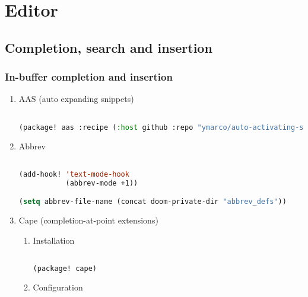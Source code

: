 \documentclass[11pt]{article}
\begin{document}
\section{Editor}
\label{sec:editor}


\subsection{Completion, search and insertion}
\label{sec:completion-search-and-insertion}


\subsubsection{In-buffer completion and insertion}
\label{sec:in-buffer-completion-and-insertion}


\begin{enumerate}
  \item AAS (auto expanding snippets)
  \label{sec:aas-auto-expanding-snippets}

  \begin{lstlisting}[language=Lisp]%! Someone please complete this list for me

(package! aas :recipe (:host github :repo "ymarco/auto-activating-snippets"))
\end{lstlisting}
  \item Abbrev
  \label{sec:abbrev}

  \begin{lstlisting}[language=Lisp]%! Someone please complete this list for me

(add-hook! 'text-mode-hook
           (abbrev-mode +1))

(setq abbrev-file-name (concat doom-private-dir "abbrev_defs"))
\end{lstlisting}
  \item Cape (completion-at-point extensions)
  \label{sec:cape-completion-at-point-extensions}

  
\begin{enumerate}
  \item Installation
  \label{sec:installation}

  \begin{lstlisting}[language=Lisp]%! Someone please complete this list for me

(package! cape)
\end{lstlisting}
  \item Configuration
  \label{sec:configuration}

  \begin{lstlisting}[language=Lisp]%! Someone please complete this list for me


\end{lstlisting}
\end{enumerate}
\end{enumerate}
\end{document}
